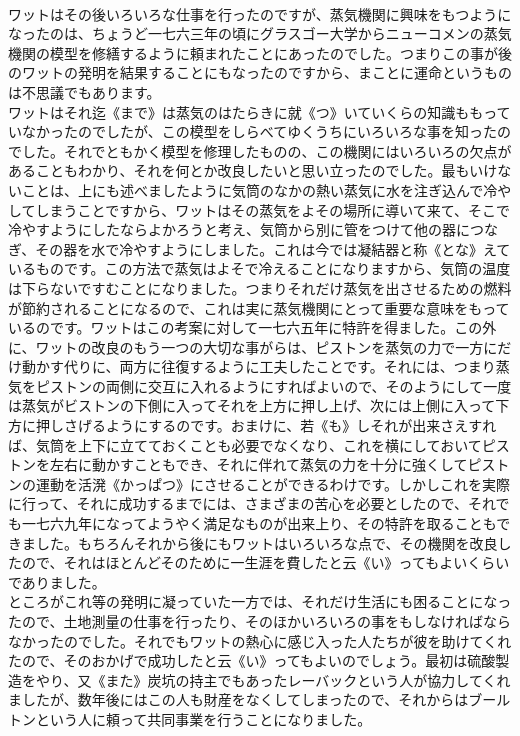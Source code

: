 \documentclass[8pt]{extreport}
\begin{document}
\begin{CJK}{UTF8}{min}
\\	ワットはその後いろいろな仕事を行ったのですが、蒸気機関に興味をもつようになったのは、ちょうど一七六三年の頃にグラスゴー大学からニューコメンの蒸気機関の模型を修繕するように頼まれたことにあったのでした。つまりこの事が後のワットの発明を結果することにもなったのですから、まことに運命というものは不思議でもあります。
\\	ワットはそれ迄《まで》は蒸気のはたらきに就《つ》いていくらの知識ももっていなかったのでしたが、この模型をしらべてゆくうちにいろいろな事を知ったのでした。それでともかく模型を修理したものの、この機関にはいろいろの欠点があることもわかり、それを何とか改良したいと思い立ったのでした。最もいけないことは、上にも述べましたように気筒のなかの熱い蒸気に水を注ぎ込んで冷やしてしまうことですから、ワットはその蒸気をよその場所に導いて来て、そこで冷やすようにしたならよかろうと考え、気筒から別に管をつけて他の器につなぎ、その器を水で冷やすようにしました。これは今では凝結器と称《とな》えているものです。この方法で蒸気はよそで冷えることになりますから、気筒の温度は下らないですむことになりました。つまりそれだけ蒸気を出させるための燃料が節約されることになるので、これは実に蒸気機関にとって重要な意味をもっているのです。ワットはこの考案に対して一七六五年に特許を得ました。この外に、ワットの改良のもう一つの大切な事がらは、ピストンを蒸気の力で一方にだけ動かす代りに、両方に往復するように工夫したことです。それには、つまり蒸気をピストンの両側に交互に入れるようにすればよいので、そのようにして一度は蒸気がビストンの下側に入ってそれを上方に押し上げ、次には上側に入って下方に押しさげるようにするのです。おまけに、若《も》しそれが出来さえすれば、気筒を上下に立てておくことも必要でなくなり、これを横にしておいてピストンを左右に動かすこともでき、それに伴れて蒸気の力を十分に強くしてピストンの運動を活溌《かっぱつ》にさせることができるわけです。しかしこれを実際に行って、それに成功するまでには、さまざまの苦心を必要としたので、それでも一七六九年になってようやく満足なものが出来上り、その特許を取ることもできました。もちろんそれから後にもワットはいろいろな点で、その機関を改良したので、それはほとんどそのために一生涯を費したと云《い》ってもよいくらいでありました。
\\	ところがこれ等の発明に凝っていた一方では、それだけ生活にも困ることになったので、土地測量の仕事を行ったり、そのほかいろいろの事をもしなければならなかったのでした。それでもワットの熱心に感じ入った人たちが彼を助けてくれたので、そのおかげで成功したと云《い》ってもよいのでしょう。最初は硫酸製造をやり、又《また》炭坑の持主でもあったレーバックという人が協力してくれましたが、数年後にはこの人も財産をなくしてしまったので、それからはブールトンという人に頼って共同事業を行うことになりました。

\end{CJK}
\end{document}

